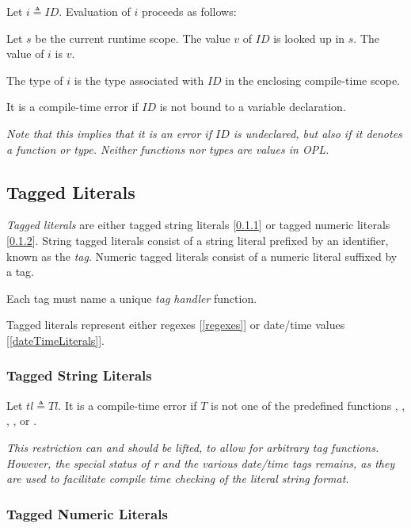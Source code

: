 \documentclass{article}
\begin{document}
\IdentifierExpression{}

Let $i \triangleq ID$.
Evaluation of $i$ proceeds as follows:

Let $s$ be the current runtime scope.
The value $v$ of $ID$ is looked up in $s$. The value of $i$ is $v$.

The type of $i$ is the type associated with $ID$ in the enclosing compile-time scope.

It is a compile-time error if $ID$ is not bound to a variable declaration.

{\em  Note that this implies that it is an error if $ID$ is undeclared, but also if it denotes a function or type. Neither functions nor types are values in OPL. }

\subsection{Tagged Literals}
\label{taggedLiterals}

{\em Tagged literals} are either  tagged string literals [\ref{taggedStringLiterals}] or tagged numeric literals [\ref{taggedNumericLiterals}]. String tagged literals consist of a string literal prefixed by an identifier, known as the {\em tag}. Numeric tagged literals consist of a numeric literal suffixed by a tag.

\TaggedLiteral{}

Each tag must name a unique {\em tag handler} function.

Tagged literals represent either regexes [\ref{regexes}] or date/time values [\ref{dateTimeLiterals}].

\subsubsection{Tagged String Literals}
\label{taggedStringLiterals}

Let $tl \triangleq Tl$.
It is a compile-time error if $T$ is not one of the predefined functions \REGEXTAG, \DATE, \TIME, \TIMESTAMP,   \DURATION{} or \INTERVAL.

{\it
This restriction can and should be lifted, to allow for arbitrary tag functions. However, the special status of r and the various date/time tags remains, as they are used to facilitate compile time checking of the literal string format.
}

\subsubsection{Tagged Numeric Literals}
\label{taggedNumericLiterals}
\end{document}
